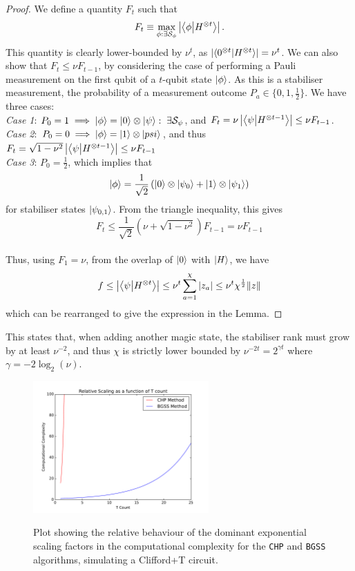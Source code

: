 \documentclass{standalone}
\begin{document}
\begin{proof}
We define a quantity $F_{t}$ such that
\[F_{t}\equiv\max_{\phi:\exists\mathcal{S}_{\phi}}\left|\braket{\phi}{H^{\otimes t}}\right|.\]
This quantity is clearly lower-bounded by $\nu^{t}$, as $\left|\braket{0^{\otimes t}}{H^{\otimes t}}\right|=\nu^{t}$. We can also show that $F_{t}\leq\nu F_{t-1}$, by considering the case of performing a Pauli measurement on the first qubit of a $t$-qubit state $\ket{\phi}$. As this is a stabiliser measurement, the probability of a measurement outcome $P_{a}\in\{0,1,\frac{1}{2}\}$. We have three cases:\\
\emph{Case 1}: $P_{0}=1\implies\ket{\phi}=\ket{0}\otimes\ket{\psi}:\;\exists\mathcal{S}_{\psi}$, and $F_{t}=\nu\left|\braket{\psi}{H^{\otimes t-1}}\right|\leq\nu F_{t-1}$.\\
\emph{Case 2}: $P_{0}=0\implies\ket{\phi}=\ket{1}\otimes\ket{psi}$, and thus $F_{t}=\sqrt{1-\nu^{2}}\left|\braket{\psi}{H^{\otimes t-1}}\right|\leq\nu F_{t-1}$\\
\emph{Case 3}: $P_{0}=\frac{1}{2}$, which implies that 
\[\ket{\phi}=\frac{1}{\sqrt{2}}\left(\ket{0}\otimes\ket{\psi_{0}}+\ket{1}\otimes\ket{\psi_{1}}\right)\]
for stabiliser states $\ket{\psi_{0,1}}$. From the triangle inequality, this gives
\[F_{t}\leq\frac{1}{\sqrt{2}}\left(\nu+\sqrt{1-\nu^{2}}\right)F_{t-1}=\nu F_{t-1}\]\\
Thus, using $F_{1}=\nu$, from the overlap of $\ket{0}$ with $\ket{H}$, we have
\[f\leq\left|\braket{\psi}{H^{\otimes t}}\right|\leq\nu^{t}\sum_{a=1}^{\chi}\vert z_{a}\vert\leq\nu^{t}\chi^{\frac{1}{2}}\norm{z}\]
which can be rearranged to give the expression in the Lemma.
\end{proof}
This states that, when adding another magic state, the stabiliser rank must grow by at least $\nu^{-2}$, and thus $\chi$ is strictly lower bounded by $\nu^{-2t}=2^{\gamma t}$ where $\gamma=-2\log_{2}\left(\nu\right)$.
\begin{figure}[h]
    \centering
    \includegraphics[width=0.6\textwidth]{Figures/tcount.pdf}
\label{fig:quadraticreduction}
\caption{Plot showing the relative behaviour of the dominant exponential scaling factors in the computational complexity for the \texttt{CHP} and \texttt{BGSS} algorithms, simulating a Clifford+T circuit.}
\end{figure}
\end{document}
